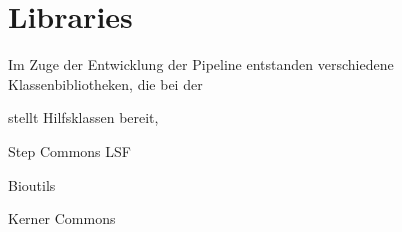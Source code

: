 \section{Libraries}
Im Zuge der Entwicklung der Pipeline entstanden verschiedene
Klassenbibliotheken, die bei der

\begin{description}
  \item[Step Commons]
  stellt Hilfsklassen bereit, 
  \item Step Commons LSF
  \item Bioutils
  \item Kerner Commons
\end{description}